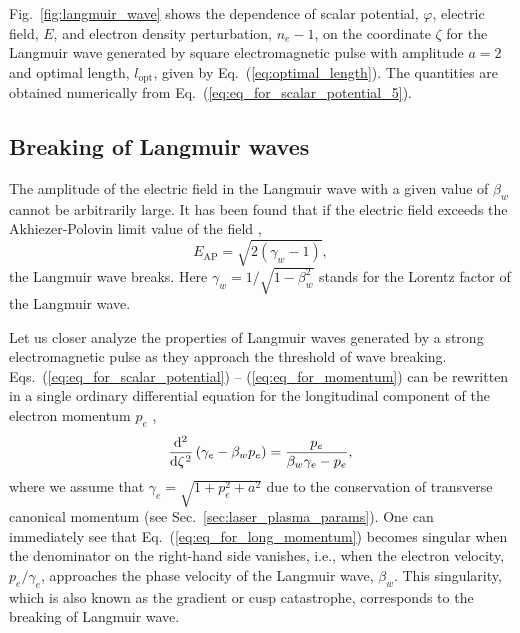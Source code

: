 \documentclass[10pt, a4paper, twoside, openright]{report}
\begin{document}
Fig.~\ref{fig:langmuir_wave} shows the dependence of scalar potential, $ \varphi $, electric field, $ E $, and electron density perturbation, $ n_e - 1 $, on the coordinate $ \zeta $ for the Langmuir wave generated by square electromagnetic pulse with amplitude $ a = 2 $ and optimal length, $ l_{\mathrm{opt}} $, given by Eq.~(\ref{eq:optimal_length}). The quantities are obtained numerically from Eq.~(\ref{eq:eq_for_scalar_potential_5}).

\subsection{Breaking of Langmuir waves}

The amplitude of the electric field in the Langmuir wave with a given value of $ \beta_w $ cannot be arbitrarily large. It has been found that if the electric field exceeds the Akhiezer-Polovin limit value of the field \cite{Akhiezer1956}, 
\begin{equation}\label{eq:akhiezer_polovin}
E_{\mathrm{AP}} = \sqrt{2 \left( \gamma_w - 1 \right)},
\end{equation}
the Langmuir wave breaks. Here $ \gamma_w = 1 / \sqrt{1 - \beta_w^2} $ stands for the Lorentz factor of the Langmuir wave. 

Let us closer analyze the properties of Langmuir waves generated by a strong electromagnetic pulse as they approach the threshold of wave breaking. Eqs.~(\ref{eq:eq_for_scalar_potential}) -- (\ref{eq:eq_for_momentum}) can be rewritten in a single ordinary differential equation for the longitudinal component of the electron momentum $ p_e $ \cite{Panchenko2008, Bulanov2013},
\begin{equation}\label{eq:eq_for_long_momentum}
\diff*[2]{\left( \gamma_e - \beta_w p_e \right)}{\zeta} = \frac{p_e}{\beta_w \gamma_e - p_e},
\end{equation}
where we assume that $ \gamma_e = \sqrt{1 + p_e^2 + a^2} $ due to the conservation of transverse canonical momentum (see Sec.~\ref{sec:laser_plasma_params}). One can immediately see that Eq.~(\ref{eq:eq_for_long_momentum}) becomes singular when the denominator on the right-hand side vanishes, i.e., when the electron velocity, $ p_e / \gamma_e $, approaches the phase velocity of the Langmuir wave, $ \beta_{w} $. This singularity, which is also known as the gradient or cusp catastrophe, corresponds to the breaking of Langmuir wave.
\end{document}
